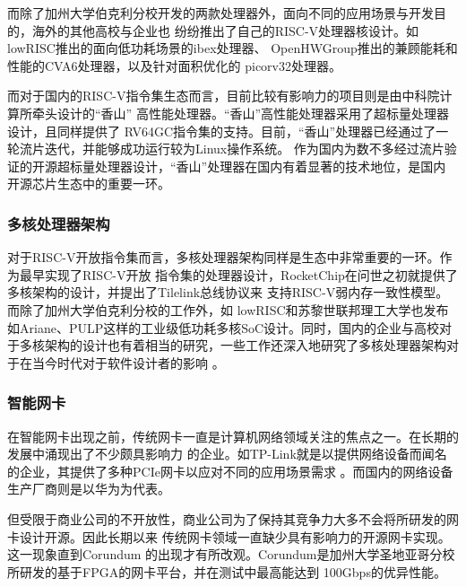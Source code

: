 而除了加州大学伯克利分校开发的两款处理器外，面向不同的应用场景与开发目的，海外的其他高校与企业也
纷纷推出了自己的RISC-V处理器核设计。如lowRISC推出的面向低功耗场景的ibex处理器\cite{lowrisc_ibex}、
OpenHWGroup推出的兼顾能耗和性能的CVA6处理器\cite{zaruba2019cost}，以及针对面积优化的
picorv32处理器\cite{picorv32}。

而对于国内的RISC-V指令集生态而言，目前比较有影响力的项目则是由中科院计算所牵头设计的“香山”
高性能处理器\cite{xiangshan_riscv}。“香山”高性能处理器采用了超标量处理器设计，且同样提供了
RV64GC指令集的支持。目前，“香山”处理器已经通过了一轮流片迭代，并能够成功运行较为Linux操作系统。
作为国内为数不多经过流片验证的开源超标量处理器设计，“香山”处理器在国内有着显著的技术地位，是国内
开源芯片生态中的重要一环。

\subsubsection{多核处理器架构}

对于RISC-V开放指令集而言，多核处理器架构同样是生态中非常重要的一环。作为最早实现了RISC-V开放
指令集的处理器设计，RocketChip在问世之初就提供了多核架构的设计，并提出了Tilelink总线协议来
支持RISC-V弱内存一致性模型\cite{asanovic2016rocket}。而除了加州大学伯克利分校的工作外，如
lowRISC和苏黎世联邦理工大学也发布如Ariane、PULP这样的工业级低功耗多核SoC设计\cite{balkind2019openpiton+,
rossi2017energy}。同时，国内的企业与高校对于多核架构的设计也有着相当的研究\cite{manycore2013fudan,
gs464e2015recent}，一些工作还深入地研究了多核处理器架构对于在当今时代对于软件设计者的影响
\cite{manycoretime2016recent}。

\subsubsection{智能网卡}
\label{section:present_smartnic}

在智能网卡出现之前，传统网卡一直是计算机网络领域关注的焦点之一。在长期的发展中涌现出了不少颇具影响力
的企业。如TP-Link就是以提供网络设备而闻名的企业，其提供了多种PCIe网卡以应对不同的应用场景需求
\cite{tplink_website}。而国内的网络设备生产厂商则是以华为为代表\cite{huawei_website}。

但受限于商业公司的不开放性，商业公司为了保持其竞争力大多不会将所研发的网卡设计开源。因此长期以来
传统网卡领域一直缺少具有影响力的开源网卡实现。这一现象直到Corundum\cite{forencich2020corundum}
的出现才有所改观。Corundum是加州大学圣地亚哥分校所研发的基于FPGA的网卡平台，并在测试中最高能达到
100Gbps的优异性能。

